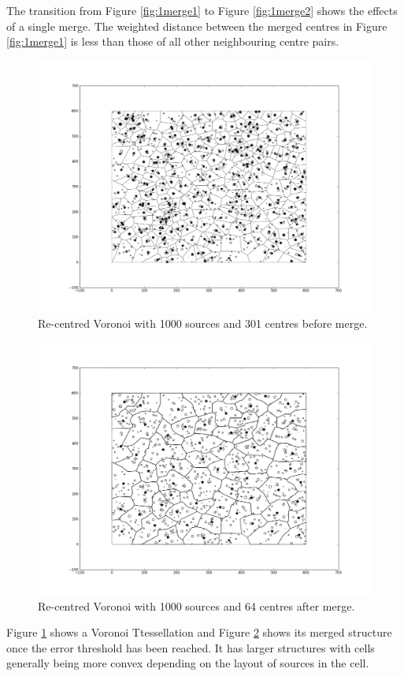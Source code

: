 The transition from Figure \ref{fig:1merge1} to Figure \ref{fig:1merge2} shows the effects of a single merge. The weighted distance between the merged centres in Figure \ref{fig:1merge1} is less than those of all other neighbouring centre pairs.
\begin{figure}[H]
\centering
  \includegraphics[width=\linewidth]{Images/merge1.png}
  \caption{Re-centred Voronoi with 1000 sources and 301 centres before merge.}
  \label{fig:merge1}
\end{figure}
\begin{figure}[H]
\centering
  \includegraphics[width=\linewidth]{Images/merge2.png}
  \caption{Re-centred Voronoi with 1000 sources and 64 centres after merge.}
  \label{fig:merge2}
\end{figure}
Figure \ref{fig:merge1} shows a Voronoi Ttessellation and Figure \ref{fig:merge2} shows its merged structure once the error threshold has been reached. It has larger structures with cells generally being more convex depending on the layout of sources in the cell.